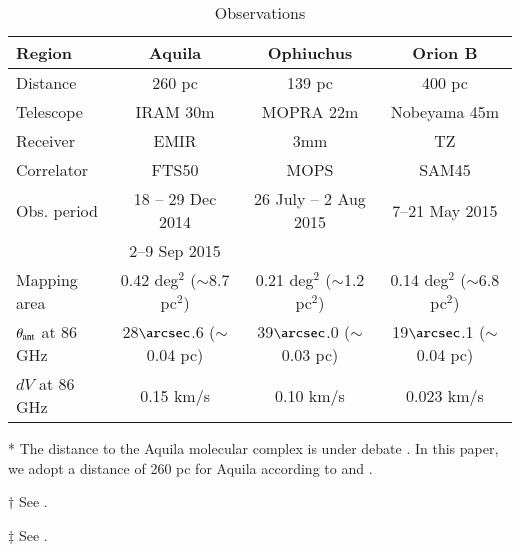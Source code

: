 \begin{table*}
\centering
\begin{threeparttable}
\caption{Observations\label{obs_parameters}}
\begin{tabular}{lccc}
\hline
Region & Aquila &  Ophiuchus   & Orion B  \\
\hline
Distance & 260 pc\tnote{*}  & 139 pc\tnote{$\dag$}  & 400 pc\tnote{$\ddag$} \\
Telescope & IRAM 30m & MOPRA 22m   & Nobeyama 45m  \\
Receiver & EMIR & 3mm & TZ  \\
Correlator & FTS50 & MOPS  & SAM45  \\
Obs. period &  18 -- 29 Dec 2014 & 26 July -- 2 Aug 2015 & 7--21 May 2015  \\
                    &  2--9 Sep 2015     & &   \\
Mapping area &  0.42 deg$^2$ ($\sim$8.7 pc$^2$) & 0.21 deg$^2$ ($\sim$1.2 pc$^2$) & 0.14 deg$^2$ ($\sim$6.8 pc$^2$)  \\
$\theta_{\rm ant}$ at 86 GHz &  28$\arcsec$.6 ($\sim$0.04 pc) &39$\arcsec$.0 ($\sim$0.03 pc) & 19$\arcsec$.1 ($\sim$0.04 pc)   \\
$dV$ at 86 GHz &  0.15 km/s & 0.10 km/s & 0.023 km/s   \\
\hline
\end{tabular}
\begin{tablenotes}
\item[*] The distance to the Aquila molecular complex is  under debate \citep{Drew97, Dzib10,Ortiz-Leon16}. In this paper, we adopt a distance of 260 pc for Aquila according to \citet{Maury11} and \citet{Konyves15}. 
\item[$\dag$] See \citet{Mamajek08}.
\item[$\ddag$] See \citet{Gibb08}. 
\end{tablenotes}
\end{threeparttable}
\end{table*}
